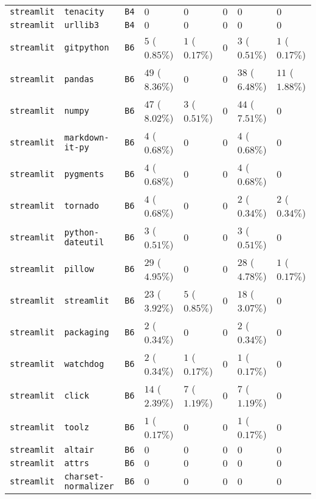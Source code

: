 \begin{table}
\begin{tabular}{llllllll}
\texttt{streamlit} & \texttt{tenacity} & \texttt{B4} & $0$ & $0$ & $0$ & $0$ & $0$ \\
\texttt{streamlit} & \texttt{urllib3} & \texttt{B4} & $0$ & $0$ & $0$ & $0$ & $0$ \\
\texttt{streamlit} & \texttt{gitpython} & \texttt{B6} & $5$ ($0.85\%$) & $1$ ($0.17\%$) & $0$ & $3$ ($0.51\%$) & $1$ ($0.17\%$) \\
\texttt{streamlit} & \texttt{pandas} & \texttt{B6} & $49$ ($8.36\%$) & $0$ & $0$ & $38$ ($6.48\%$) & $11$ ($1.88\%$) \\
\texttt{streamlit} & \texttt{numpy} & \texttt{B6} & $47$ ($8.02\%$) & $3$ ($0.51\%$) & $0$ & $44$ ($7.51\%$) & $0$ \\
\texttt{streamlit} & \texttt{markdown-it-py} & \texttt{B6} & $4$ ($0.68\%$) & $0$ & $0$ & $4$ ($0.68\%$) & $0$ \\
\texttt{streamlit} & \texttt{pygments} & \texttt{B6} & $4$ ($0.68\%$) & $0$ & $0$ & $4$ ($0.68\%$) & $0$ \\
\texttt{streamlit} & \texttt{tornado} & \texttt{B6} & $4$ ($0.68\%$) & $0$ & $0$ & $2$ ($0.34\%$) & $2$ ($0.34\%$) \\
\texttt{streamlit} & \texttt{python-dateutil} & \texttt{B6} & $3$ ($0.51\%$) & $0$ & $0$ & $3$ ($0.51\%$) & $0$ \\
\texttt{streamlit} & \texttt{pillow} & \texttt{B6} & $29$ ($4.95\%$) & $0$ & $0$ & $28$ ($4.78\%$) & $1$ ($0.17\%$) \\
\texttt{streamlit} & \texttt{streamlit} & \texttt{B6} & $23$ ($3.92\%$) & $5$ ($0.85\%$) & $0$ & $18$ ($3.07\%$) & $0$ \\
\texttt{streamlit} & \texttt{packaging} & \texttt{B6} & $2$ ($0.34\%$) & $0$ & $0$ & $2$ ($0.34\%$) & $0$ \\
\texttt{streamlit} & \texttt{watchdog} & \texttt{B6} & $2$ ($0.34\%$) & $1$ ($0.17\%$) & $0$ & $1$ ($0.17\%$) & $0$ \\
\texttt{streamlit} & \texttt{click} & \texttt{B6} & $14$ ($2.39\%$) & $7$ ($1.19\%$) & $0$ & $7$ ($1.19\%$) & $0$ \\
\texttt{streamlit} & \texttt{toolz} & \texttt{B6} & $1$ ($0.17\%$) & $0$ & $0$ & $1$ ($0.17\%$) & $0$ \\
\texttt{streamlit} & \texttt{altair} & \texttt{B6} & $0$ & $0$ & $0$ & $0$ & $0$ \\
\texttt{streamlit} & \texttt{attrs} & \texttt{B6} & $0$ & $0$ & $0$ & $0$ & $0$ \\
\texttt{streamlit} & \texttt{charset-normalizer} & \texttt{B6} & $0$ & $0$ & $0$ & $0$ & $0$ \\

\end{tabular}
\end{table}
